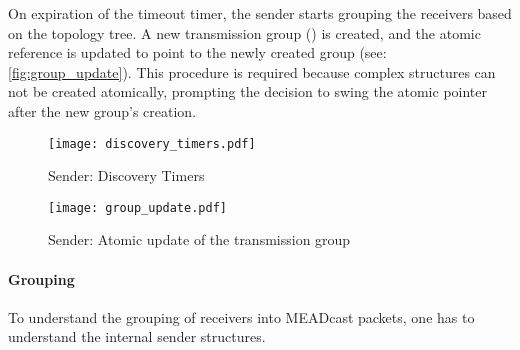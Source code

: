 On expiration of the timeout timer, the sender starts grouping the receivers
    based on the topology tree.
A new transmission group () is created, and the atomic
    reference is updated to point to the newly created group (see:
    \autoref{fig:group_update}).
This procedure is required because complex structures can not be created
    atomically, prompting the decision to swing the atomic pointer after the
    new group's creation.


\begin{figure}
    \begin{center}
        \texttt{[image: discovery\_timers.pdf]}
    \end{center}
    \caption{Sender: Discovery Timers}
    \label{fig:discovery_timers}
\end{figure}

\begin{figure}
    \begin{center}
        \texttt{[image: group\_update.pdf]}
    \end{center}
    \caption{Sender: Atomic update of the transmission group}
    \label{fig:group_update}
\end{figure}

\paragraph{Grouping} %
\label{par:Grouping}
To understand the grouping of receivers into MEADcast packets, one has to
    understand the internal sender structures.



